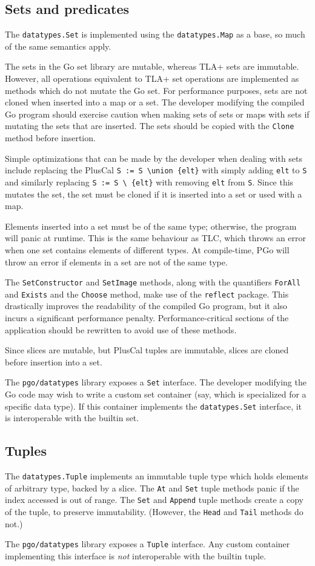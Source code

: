 \subsection{Sets and predicates}
The \texttt{datatypes.Set} is implemented using the \texttt{datatypes.Map} as a base, so much of the same semantics apply.

The sets in the Go set library are mutable, whereas TLA+ sets are immutable. However, all operations equivalent to TLA+ set operations are implemented as methods which do not mutate the Go set. For performance purposes, sets are not cloned when inserted into a map or a set. The developer modifying the compiled Go program should exercise caution when making sets of sets or maps with sets if mutating the sets that are inserted. The sets should be copied with the \texttt{Clone} method before insertion.

Simple optimizations that can be made by the developer when dealing with sets include replacing the PlusCal \verb|S := S \union {elt}| with simply adding \texttt{elt} to \texttt{S} and similarly replacing \verb|S := S \ {elt}| with removing \texttt{elt} from \texttt{S}. Since this mutates the set, the set must be cloned if it is inserted into a set or used with a map.

Elements inserted into a set must be of the same type; otherwise, the program will panic at runtime. This is the same behaviour as TLC, which throws an error when one set contains elements of different types. At compile-time, PGo will throw an error if elements in a set are not of the same type.

The \texttt{SetConstructor} and \texttt{SetImage} methods, along with the quantifiers \texttt{ForAll} and \texttt{Exists} and the \texttt{Choose} method, make use of the \texttt{reflect} package. This drastically improves the readability of the compiled Go program, but it also incurs a significant performance penalty. Performance-critical sections of the application should be rewritten to avoid use of these methods.

Since slices are mutable, but PlusCal tuples are immutable, slices are cloned before insertion into a set.

The \texttt{pgo/datatypes} library exposes a \texttt{Set} interface. The developer modifying the Go code may wish to write a custom set container (say, which is specialized for a specific data type). If this container implements the \texttt{datatypes.Set} interface, it is interoperable with the builtin set.

\subsection{Tuples}
The \texttt{datatypes.Tuple} implements an immutable tuple type which holds elements of arbitrary type, backed by a slice. The \texttt{At} and \texttt{Set} tuple methods panic if the index accessed is out of range. The \texttt{Set} and \texttt{Append} tuple methods create a copy of the tuple, to preserve immutability. (However, the \texttt{Head} and \texttt{Tail} methods do not.)

The \texttt{pgo/datatypes} library exposes a \texttt{Tuple} interface. Any custom container implementing this interface is \emph{not} interoperable with the builtin tuple.
